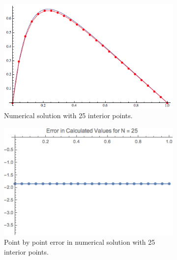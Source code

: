\documentclass[twocolumn, groupedaddress]{revtex4-1}
\begin{document}
\begin{figure}
	\begin{subfigure}{.5\textwidth}
  		\centering
  		\includegraphics[width=.9\linewidth]{solutionN25}
  		\caption{Numerical solution with 25 interior points.}
	\end{subfigure}%
	\begin{subfigure}{.5\textwidth}
  		\centering
  		\includegraphics[width=.9\linewidth]{solutionErrorN25}
  		\caption{Point by point error in numerical solution with 25 interior points.}
	\end{subfigure}

	\caption{\label{fig:result3}}
\end{figure}
	
\end{document}
